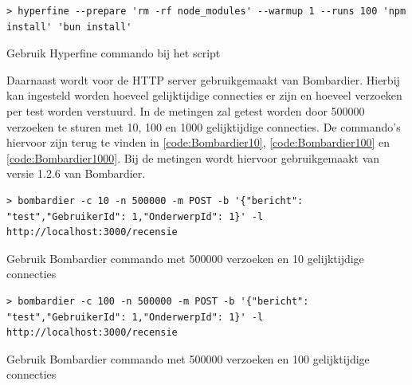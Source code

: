 \begin{listing}[H]
  \centering
  \begin{verbatim}
> hyperfine --prepare 'rm -rf node_modules' --warmup 1 --runs 100 'npm install' 'bun install'
      \end{verbatim}
      \caption{\label{code:HyperfineInstall}Gebruik Hyperfine commando bij het script}
\end{listing}
Daarnaast wordt voor de HTTP server gebruikgemaakt van Bombardier. 
Hierbij kan ingesteld worden hoeveel gelijktijdige connecties er zijn en hoeveel verzoeken per test worden verstuurd.
In de metingen zal getest worden door 500000 verzoeken te sturen met 10, 100 en 1000 gelijktijdige connecties.
De commando's hiervoor zijn terug te vinden in \ref{code:Bombardier10}, \ref{code:Bombardier100} en \ref{code:Bombardier1000}.
Bij de metingen wordt hiervoor gebruikgemaakt van versie 1.2.6 van Bombardier.
\begin{listing}[H]
  \centering
  \begin{verbatim}
> bombardier -c 10 -n 500000 -m POST -b '{"bericht": "test","GebruikerId": 1,"OnderwerpId": 1}' -l http://localhost:3000/recensie
      \end{verbatim}
      \caption{\label{code:Bombardier10}Gebruik Bombardier commando met 500000 verzoeken en 10 gelijktijdige connecties}
\end{listing}
\begin{listing}[H]
  \centering
  \begin{verbatim}
> bombardier -c 100 -n 500000 -m POST -b '{"bericht": "test","GebruikerId": 1,"OnderwerpId": 1}' -l http://localhost:3000/recensie
      \end{verbatim}
      \caption{\label{code:Bombardier100}Gebruik Bombardier commando met 500000 verzoeken en 100 gelijktijdige connecties}
\end{listing}

